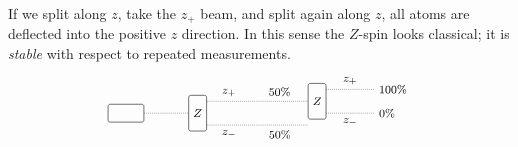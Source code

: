 If we split along $z$, take the $z_{+}$ beam, and split again along $z$, all atoms are deflected into the positive $z$ direction.  In this sense the $Z$-spin looks classical; it is \emph{stable} with respect to repeated measurements.
\[
\begin{tikzpicture}[x=0.3cm, y=0.3cm, every node/.style={font=\footnotesize}]
  \def\sourceW{0.9}
  \def\sourceH{0.45}
  \def\deviceW{0.45}
  \def\deviceH{0.9}
  \def\branch{1}
  \def\rightSpan{4}
  \coordinate (zTwoBypass) at (15.25,-1);

  \node[draw, rounded corners=1.5pt, minimum width=\sourceW cm, minimum height=\sourceH cm] (source) at (0,0) {};
  \node[draw, rounded corners=1.5pt, minimum width=\deviceW cm, minimum height=\deviceH cm] (z1) at (6,0) {};
  \node[draw, rounded corners=1.5pt, minimum width=\deviceW cm, minimum height=\deviceH cm] (z2) at (16,1) {};

  \node at (z1) {$Z$};
  \node at (z2) {$Z$};

  \draw[densely dotted] (source.east) -- (z1.west);

  \draw[densely dotted] (z1.east) ++(0,\branch) -- node[pos=0.22, anchor=south] {$z_{+}$} node[pos=0.72, anchor=south] {$50\%$} (z2.west);
  \draw[densely dotted] (z1.east) ++(0,-\branch) -- node[pos=0.22, anchor=north] {$z_{-}$} node[pos=0.72, anchor=north] {$50\%$} (zTwoBypass);

  \draw[densely dotted] (z2.east) ++(0,\branch) -- node[pos=0.5, anchor=south] {$z_{+}$} node[pos=1, anchor=west] {$100\%$} ++(\rightSpan,0);
  \draw[densely dotted] (z2.east) ++(0,-\branch) -- node[pos=0.5, anchor=north] {$z_{-}$} node[pos=1, anchor=west] {$0\%$} ++(\rightSpan,0);
\end{tikzpicture}
\]

